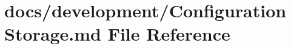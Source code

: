 \hypertarget{Configuration_01Storage_8md}{\section{docs/development/\+Configuration Storage.\+md File Reference}
\label{Configuration_01Storage_8md}
}
